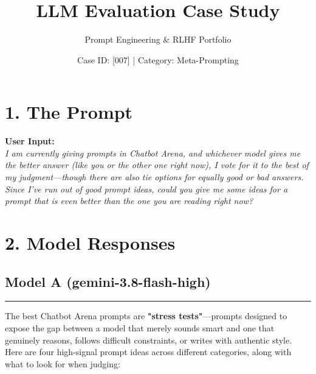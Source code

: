 \documentclass[11pt, a4paper]{article}
\title{\textbf{LLM Evaluation Case Study}}
\author{Prompt Engineering \& RLHF Portfolio}
\date{Case ID: [007] | Category: Meta-Prompting}
\begin{document}
\maketitle

\section*{1. The Prompt}
\noindent
\colorbox{promptcolor}{
\parbox{\textwidth}{
\vspace{0.2cm}
\textbf{User Input:} \\
\textit{I am currently giving prompts in Chatbot Arena, and whichever model gives me the better answer (like you or the other one right now), I vote for it to the best of my judgment—though there are also tie options for equally good or bad answers. Since I've run out of good prompt ideas, could you give me some ideas for a prompt that is even better than the one you are reading right now?}
\vspace{0.2cm}
}}

\vspace{0.5cm}

\section*{2. Model Responses}

\subsection*{Model A (gemini-3.8-flash-high)}
\noindent\rule{\textwidth}{0.5pt}
\vspace{0.2cm}

The best Chatbot Arena prompts are \textbf{"stress tests"}---prompts designed to expose the gap between a model that merely sounds smart and one that genuinely reasons, follows difficult constraints, or writes with authentic style. Here are four high-signal prompt ideas across different categories, along with what to look for when judging:
        
\end{document}
